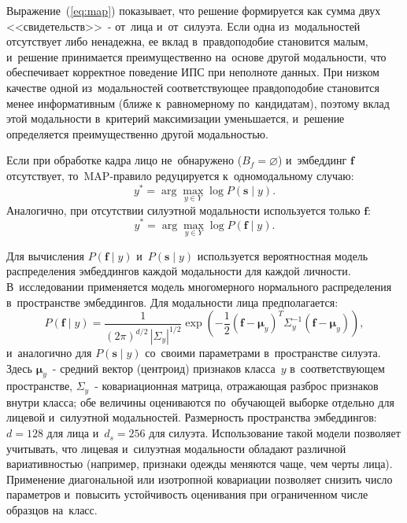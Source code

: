Выражение~(\ref{eq:map}) показывает, что решение формируется как сумма двух
<<свидетельств>>~- от~лица и~от~силуэта. Если одна из~модальностей отсутствует
либо ненадежна, ее вклад в~правдоподобие становится малым, и~решение
принимается преимущественно на~основе другой модальности, что обеспечивает
корректное поведение ИПС при неполноте данных. При низком качестве одной
из~модальностей соответствующее правдоподобие становится менее информативным
(ближе к~равномерному по~кандидатам), поэтому вклад этой модальности
в~критерий максимизации уменьшается, и~решение определяется преимущественно
другой модальностью.

Если при обработке кадра лицо не~обнаружено ($B_f=\varnothing$) и~эмбеддинг
$\mathbf{f}$ отсутствует, то~MAP-правило редуцируется к~одномодальному случаю:
\begin{equation}
    y^*=\arg\max\limits_{y\in Y}\log P(\mathbf{s}\mid y).
    \label{eq:map-only-s}
\end{equation}
Аналогично, при отсутствии силуэтной модальности используется только
$\mathbf{f}$:
\begin{equation}
    y^*=\arg\max\limits_{y\in Y}\log P(\mathbf{f}\mid y).
    \label{eq:map-only-f}
\end{equation}

Для вычисления $P(\mathbf{f}\mid y)$ и~$P(\mathbf{s}\mid y)$ используется
вероятностная модель распределения эмбеддингов каждой модальности для каждой
личности. В~исследовании применяется модель многомерного нормального
распределения в~пространстве эмбеддингов. Для модальности лица
предполагается:
\begin{equation}
    P(\mathbf{f}\mid y)=
    \frac{1}{(2\pi)^{d/2}\,|\Sigma_y|^{1/2}}
    \exp\!\left(-\frac{1}{2}(\mathbf{f}-\boldsymbol{\mu}_y)^T
    \Sigma_y^{-1}(\mathbf{f}-\boldsymbol{\mu}_y)\right),
    \label{eq:gauss}
\end{equation}
и~аналогично для $P(\mathbf{s}\mid y)$ со~своими параметрами в~пространстве
силуэта. Здесь $\boldsymbol{\mu}_y$~- средний вектор (центроид) признаков
класса~$y$ в~соответствующем пространстве, $\Sigma_y$~- ковариационная
матрица, отражающая разброс признаков внутри класса; обе величины
оцениваются по~обучающей выборке отдельно для лицевой и~силуэтной
модальностей. Размерность пространства эмбеддингов: $d=128$ для лица
и~$d_s=256$ для силуэта. Использование такой модели позволяет учитывать,
что лицевая и~силуэтная модальности обладают различной вариативностью
(например, признаки одежды меняются чаще, чем черты лица). Применение диагональной
или изотропной ковариации позволяет снизить число параметров и~повысить
устойчивость оценивания при ограниченном числе образцов на~класс.

